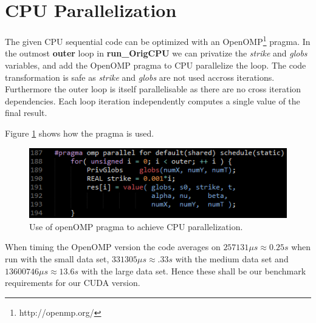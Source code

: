 \section{CPU Parallelization}
The given CPU sequential code can be optimized with an
OpenOMP\footnote{http://openmp.org/} pragma. In the outmost \textbf{outer} loop
in \textbf{run\_OrigCPU} we can privatize the \emph{strike} and \emph{globs}
variables, and add the OpenOMP pragma to CPU parallelize the loop. The code
transformation is safe as \emph{strike} and \emph{globs} are not used accross
iterations. Furthermore the outer loop is itself parallelisable as there are
no cross iteration dependencies. Each loop iteration independently computes a
single value of the final result.

Figure \ref{fig:openOMP} shows how the pragma is used.
\begin{figure}[!ht]
\centering
\includegraphics[scale=0.95]{input/figures/openOMPCPU.png}
\caption{Use of openOMP pragma to achieve CPU parallelization.\label{fig:openOMP}}
\end{figure}

When timing the OpenOMP version the code averages on $257131\mu s \approx 0.25s$
when run with the small data set, $331305\mu s \approx .33s$ with the medium
data set and $13600746\mu s \approx 13.6s$ with the large data set.
Hence these shall be our benchmark requirements for our CUDA version.
